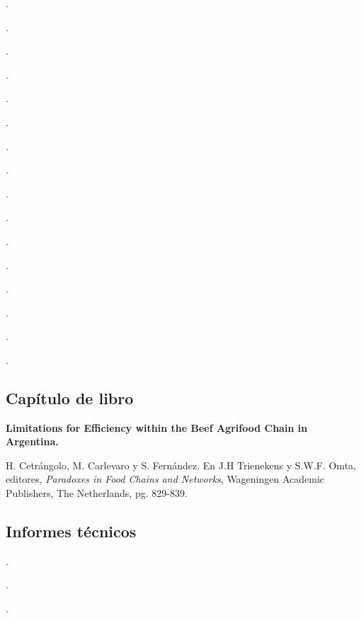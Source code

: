 \begin{etaremune}
\item {}.
\item {}.
\item {}.
\item {}.
\item {}.
\item {}.
\item {}.
\item {}.
\item {}.
\item {}.
\item {}.
\item {}.
\item {}.
\item {}.
\item {}.
\item {}.
\end{etaremune}


\subsection{Capítulo de libro}
\textbf{Limitations for Efficiency within the Beef Agrifood Chain in Argentina.}
 
 H. Cetrángolo, M. Carlevaro y S. Fernández. En J.H Trienekens y S.W.F. Omta, editores,  \textit{Paradoxes in Food Chains and Networks}, Wageningen Academic Publishers, The Netherlands, pg. 829-839.
 
 \subsection{Informes técnicos}
 \begin{etaremune}
  \item {} .
  \item {} .
  \item {} . 
 \end{etaremune}

 
